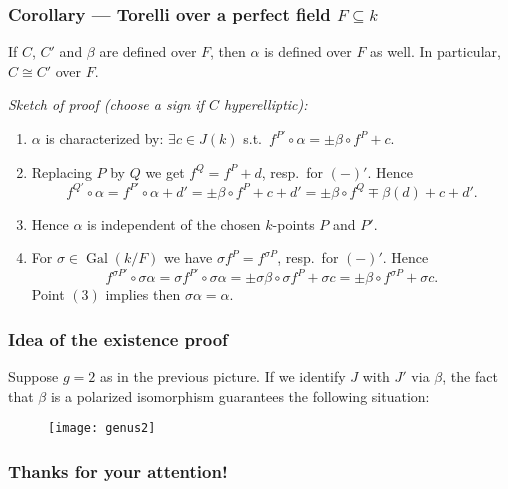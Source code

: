 \documentclass[notheorems, hyperref]{beamer}
\theoremstyle{darkgreentheorem}
\theoremstyle{darkbluedefinition}
\theoremstyle{darkredexample}
\theoremstyle{remark}
\begin{document}
\begin{frame}
    \frametitle{Corollary --- Torelli over a perfect field $F\subseteq k$} 
    \begin{tcolorbox}[colback=blue!5!white,colframe=blue!5!white]
    If $C$, $C'$ and $\beta$ are defined over $F$, then $\alpha$ is defined over $F$ as well.
	In particular, $C\cong C'$ over $F$.
    \end{tcolorbox}
    \textit{Sketch of proof (choose a sign if $C$ hyperelliptic):}
    \begin{enumerate}[label=(\arabic*)]
	\item $\alpha$ is characterized by: $\exists c\in J(k)$ s.t.~$f^{P'}\circ \alpha=\pm \beta\circ f^{P}+c$.
	\item Replacing $P$ by $Q$ we get $f^{Q}=f^{P}+d$, resp.~for $(-)'$.
	    Hence
	    \[ f^{Q'}\circ \alpha=f^{P'}\circ \alpha+d'=\pm \beta \circ f^{P}+c+d'=\pm \beta \circ f^{Q}\mp \beta(d)+c+d'. \]
	\item Hence $\alpha$ is independent of the chosen $k$-points $P$ and $P'$.
	\item For $\sigma\in \operatorname{Gal}(k/F)$ we have $\sigma f^{P}=f^{\sigma P}$, resp.~for $(-)'$.
	    Hence
	    \[ f^{\sigma P'}\circ \sigma\alpha =\sigma f^{P'}\circ \sigma \alpha=\pm \sigma \beta\circ \sigma f^{P}+\sigma c=\pm \beta \circ f^{\sigma P}+\sigma c. \]
	    Point $(3)$ implies then $\sigma \alpha=\alpha$.
    \end{enumerate}
\end{frame}

\begin{frame}
    \frametitle{Idea of the existence proof}
    Suppose $g=2$ as in the previous picture.
    If we identify $J$ with $J'$ via $\beta$, the fact that $\beta$ is a polarized isomorphism guarantees the following situation:
    \begin{figure}[htp]
	\centering
	\texttt{[image: genus2]}
    \end{figure}
\end{frame}

\begin{frame}
    \frametitle{Thanks for your attention!}
    
    
\end{frame}
\end{document}
